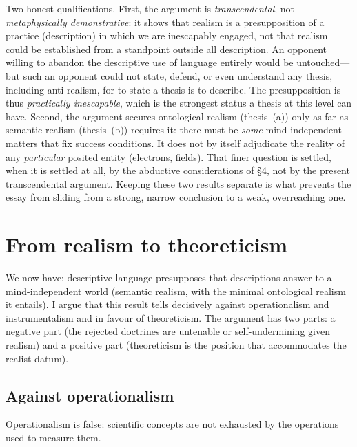 \documentclass[12pt]{article}
\begin{document}
Two honest qualifications. First, the argument is \emph{transcendental},
not \emph{metaphysically demonstrative}: it shows that realism is a
presupposition of a practice (description) in which we are inescapably
engaged, not that realism could be established from a standpoint outside
all description. An opponent willing to abandon the descriptive use of
language entirely would be untouched---but such an opponent could not
state, defend, or even understand any thesis, including anti-realism, for
to state a thesis is to describe. The presupposition is thus
\emph{practically inescapable}, which is the strongest status a thesis at
this level can have. Second, the argument secures ontological realism
(thesis~(a)) only as far as semantic realism (thesis~(b)) requires it:
there must be \emph{some} mind-independent matters that fix success
conditions. It does not by itself adjudicate the reality of any
\emph{particular} posited entity (electrons, fields). That finer question
is settled, when it is settled at all, by the abductive considerations of
\S4, not by the present transcendental argument. Keeping these two
results separate is what prevents the essay from sliding from a strong,
narrow conclusion to a weak, overreaching one.

\section{From realism to theoreticism}

We now have: descriptive language presupposes that descriptions answer to
a mind-independent world (semantic realism, with the minimal ontological
realism it entails). I argue that this result tells decisively against
operationalism and instrumentalism and in favour of theoreticism. The
argument has two parts: a negative part (the rejected doctrines are
untenable or self-undermining given realism) and a positive part
(theoreticism is the position that accommodates the realist datum).

\subsection{Against operationalism}

\begin{description}[leftmargin=1.6em,style=nextline]
\item[Claim 4.] Operationalism is false: scientific concepts are not
exhausted by the operations used to measure them.
\end{description}
\end{document}
